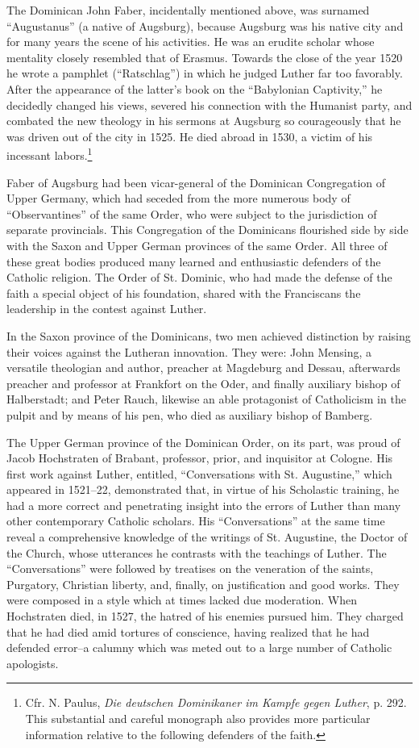 The Dominican John Faber, incidentally mentioned above, was
surnamed “Augustanus” (a native of Augsburg), because Augsburg
was his native city and for many years the scene of his activities. He
was an erudite scholar whose mentality closely resembled that of
Erasmus. Towards the close of the year 1520 he wrote a pamphlet
(“Ratschlag”) in which he judged Luther far too favorably. After
the appearance of the latter’s book on the “Babylonian Captivity,”
he decidedly changed his views, severed his connection with the Humanist
party, and combated the new theology in his sermons at Augsburg so courageously
that he was driven out of the city in 1525. He
died abroad in 1530, a victim of his incessant labors.\footnote
{Cfr. N. Paulus, \textit{Die deutschen Dominikaner im Kampfe gegen Luther}, p. 292. This
substantial and careful monograph also provides more particular information relative to
the following defenders of the faith.}

Faber of Augsburg had been vicar-general of the Dominican Congregation
of Upper Germany, which had seceded from the more
numerous body of “Observantines” of the same Order, who were
subject to the jurisdiction of separate provincials. This Congregation
of the Dominicans flourished side by side with the Saxon and
Upper German provinces of the same Order. All three of these great
bodies produced many learned and enthusiastic defenders of the
Catholic religion. The Order of St. Dominic, who had made the defense
of the faith a special object of his foundation, shared with the
Franciscans the leadership in the contest against Luther.

In the Saxon province of the Dominicans, two men achieved distinction by
raising their voices against the Lutheran innovation.
They were: John Mensing, a versatile theologian and author, preacher
at Magdeburg and Dessau, afterwards preacher and professor at
Frankfort on the Oder, and finally auxiliary bishop of Halberstadt;
and Peter Rauch, likewise an able protagonist of Catholicism in the
pulpit and by means of his pen, who died as auxiliary bishop of Bamberg.

The Upper German province of the Dominican Order, on its part,
was proud of Jacob Hochstraten of Brabant, professor, prior, and
inquisitor at Cologne. His first work against Luther, entitled, “Conversations
with St. Augustine,” which appeared in 1521--22, demonstrated that, in virtue
of his Scholastic training, he had a more correct and penetrating insight
into the errors of Luther than many
other contemporary Catholic scholars. His “Conversations” at the
same time reveal a comprehensive knowledge of the writings of St.
Augustine, the Doctor of the Church, whose utterances he contrasts
with the teachings of Luther. The “Conversations” were followed by
treatises on the veneration of the saints, Purgatory, Christian liberty,
and, finally, on justification and good works. They were composed
in a style which at times lacked due moderation. When Hochstraten
died, in 1527, the hatred of his enemies pursued him. They charged
that he had died amid tortures of conscience, having realized that he
had defended error--a calumny which was meted out to a large number of
Catholic apologists.

